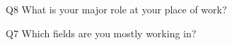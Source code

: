 \begin{description}%
\item{Q8} What is your major role at your place of work?%
\item{Q7} Which fields are you mostly working in?%
\end{description}%
